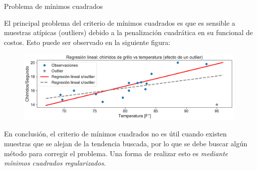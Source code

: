 \documentclass[handout, 9pt]{beamer}
\begin{document}
\begin{frame}{Problema de mínimos cuadrados}

El principal problema del criterio de mínimos cuadrados es que es sensible a muestras atípicas (outliers) debido a la penalización cuadrática en su funcional de costos. Esto puede ser observado en la siguiente figura:

\begin{figure}[h]
	\centering
	\includegraphics[width=1\textwidth]{../img/cap2_chirridos_outlier.pdf}\\
\end{figure} \pause

En conclusión, el criterio de mínimos cuadrados no es útil cuando existen muestras que se alejan de la tendencia buscada, por lo que se debe buscar algún método para corregir el problema. Una forma de realizar esto es \emph{mediante mínimos cuadrados regularizados}.
	
\end{frame}
\end{document}
